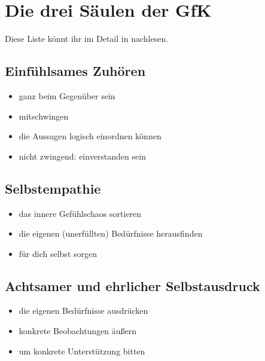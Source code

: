 \section{Die drei Säulen der GfK}
\label{gfk-saeulen}

Diese Liste könnt ihr im Detail in \cite[S.~33~f]{gfk-dummies} nachlesen.

\subsection{Einfühlsames Zuhören}

\begin{itemize}
    \item ganz beim Gegenüber sein
    \item mitschwingen
    \item die Aussagen logisch einordnen können
    \item nicht zwingend: einverstanden sein
\end{itemize}

\subsection{Selbstempathie}

\begin{itemize}
    \item das innere Gefühlschaos sortieren
    \item die eigenen (unerfüllten) Bedürfnisse herausfinden
    \item für dich selbst sorgen
\end{itemize}

\subsection{Achtsamer und ehrlicher Selbstausdruck}

\begin{itemize}
    \item die eigenen Bedürfnisse ausdrücken
    \item konkrete Beobachtungen äußern
    \item um konkrete Unterstützung bitten
\end{itemize}
